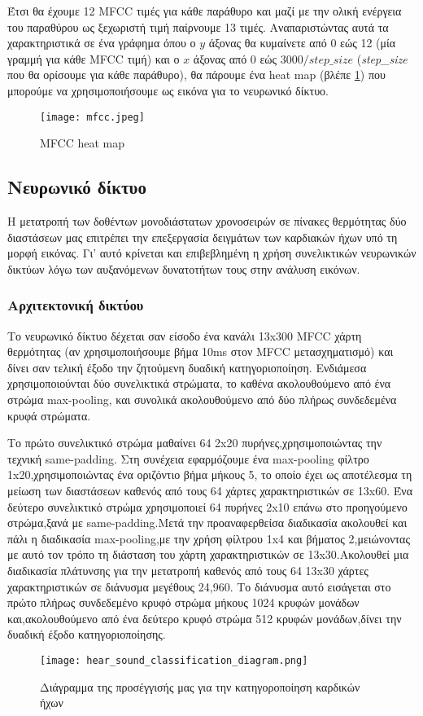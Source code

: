 Έτσι θα έχουμε 12 MFCC τιμές για κάθε παράθυρο και μαζί με την ολική ενέργεια
του παραθύρου ως ξεχωριστή τιμή παίρνουμε 13 τιμές. Αναπαριστώντας αυτά τα
χαρακτηριστικά σε ένα γράφημα όπου ο $y$ άξονας θα κυμαίνετε από 0 εώς 12 (μία
γραμμή για κάθε MFCC τιμή) και ο $x$ άξονας από 0 εώς $3000 / step\_size$
(\emph{step\_size} που θα ορίσουμε για κάθε παράθυρο), θα πάρουμε ένα heat map
(βλέπε \ref{mfcc}) που μπορούμε να χρησιμοποιήσουμε ως εικόνα για το νευρωνικό
δίκτυο.

\begin{figure}[H]
	\center
	\texttt{[image: mfcc.jpeg]}
	\caption{MFCC heat map \cite{fayek2016}}
	\label{mfcc}
\end{figure}

\subsection{Νευρωνικό δίκτυο}

Η μετατροπή των δοθέντων μονοδιάστατων χρονοσειρών σε πίνακες θερμότητας δύο διαστάσεων
μας επιτρέπει την επεξεργασία δειγμάτων των καρδιακών ήχων υπό τη μορφή εικόνας. Γι' αυτό
κρίνεται και επιβεβλημένη η χρήση συνελικτικών νευρωνικών δικτύων λόγω των αυξανόμενων
δυνατοτήτων τους στην ανάλυση εικόνων.
\subsubsection{Αρχιτεκτονική δικτύου}

Το νευρωνικό δίκτυο δέχεται σαν είσοδο ένα κανάλι 13x300 MFCC χάρτη θερμότητας
(αν χρησιμοποιήσουμε βήμα 10ms στον MFCC μετασχηματισμό) και δίνει σαν τελική
έξοδο την ζητούμενη δυαδική κατηγοριοποίηση. Ενδιάμεσα χρησιμοποιούνται δύο
συνελικτικά στρώματα, το καθένα ακολουθούμενο από ένα στρώμα max-pooling, και
συνολικά ακολουθούμενο από δύο πλήρως συνδεδεμένα κρυφά στρώματα. \par

Το πρώτο συνελικτικό στρώμα μαθαίνει 64 2x20 πυρήνες,χρησιμοποιώντας την τεχνική
same-padding.  Στη συνέχεια εφαρμόζουμε ένα max-pooling φίλτρο
1x20,χρησιμοποιώντας ένα οριζόντιο βήμα μήκους 5, το οποίο έχει ως αποτέλεσμα τη
μείωση των διαστάσεων καθενός από τους 64 χάρτες χαρακτηριστικών σε 13x60. Ένα
δεύτερο συνελικτικό στρώμα χρησιμοποιεί 64 πυρήνες 2x10 επάνω στο προηγούμενο
στρώμα,ξανά με same-padding.Μετά την προαναφερθείσα διαδικασία ακολουθεί και
πάλι η διαδικασία max-pooling,με την χρήση φίλτρου 1x4 και βήματος 2,μειώνοντας
με αυτό τον τρόπο τη διάσταση του χάρτη χαρακτηριστικών σε 13x30.Ακολουθεί μια
διαδικασία πλάτυνσης για την μετατροπή καθενός από τους 64 13x30 χάρτες
χαρακτηριστικών σε διάνυσμα μεγέθους 24,960. Το διάνυσμα αυτό εισάγεται στο
πρώτο πλήρως συνδεδεμένο κρυφό στρώμα μήκους 1024 κρυφών μονάδων
και,ακολουθούμενο από ένα δεύτερο κρυφό στρώμα 512 κρυφών μονάδων,δίνει την
δυαδική έξοδο κατηγοριοποίησης. \par

\begin{figure}[H]
	\center
	\texttt{[image: hear\_sound\_classification\_diagram.png]}
	\caption{Διάγραμμα της προσέγγισής μας για την κατηγοροποίηση καρδικών ήχων}
	\label{our_approach_diagram}
\end{figure}
